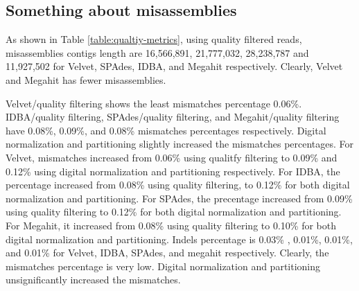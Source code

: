 
 


 
 \subsection*{Something about misassemblies}  
As shown in Table \ref {table:qualtiy-metrics}, using quality filtered reads, misassemblies contigs length are 16,566,891, 21,777,032, 28,238,787 and 11,927,502 for Velvet, SPAdes, IDBA, and Megahit respectively.  Clearly, Velvet and Megahit has fewer misassemblies.  

Velvet/quality filtering shows the least mismatches percentage 0.06\%.  IDBA/quality filtering, SPAdes/quality filtering, and Megahit/quality filtering have 0.08\%, 0.09\%, and 0.08\% mismatches percentages respectively. Digital normalization and partitioning slightly increased the mismatches percentages. For Velvet, mismatches increased from 0.06\% using qualitfy filtering to 0.09\% and 0.12\% using digital normalization and partitioning respectively. For IDBA, the percentage increased from 0.08\% using quality filtering, to 0.12\% for both digital normalization and partitioning. For SPAdes, the precentage increased from 0.09\% using quality filtering to 0.12\% for both digital normalization and partitioning. For Megahit, it increased from 0.08\% using quality filtering to 0.10\% for both digital normalization and partitioning.
Indels percentage is 0.03\% , 0.01\%, 0.01\%, and  0.01\%  for Velvet, IDBA, SPAdes, and megahit respectively. 
Clearly, the mismatches percentage is very low. Digital normalization and partitioning unsignificantly increased the mismatches. 
 
